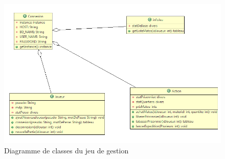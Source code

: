 \begin{figure}[h]
 \centering
 \includegraphics[width=\textwidth]{../umls/UML_images/Commissariat/class} \hfill
 \caption{Diagramme de classes du jeu de gestion}
\end{figure}